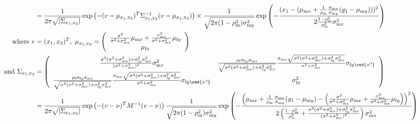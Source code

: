\documentclass{article}
\newcommand{\x}[1]{\text{#1}}
\begin{document}
\begin{landscape}
\begin{align*}
\\&=\frac{1}{2\pi\sqrt{|\Sigma_{x_1,x_2}|}}\exp\left(-(v-\mu_{x_1,x_2})^T\Sigma_{x_1,x_2}^{-1}(v-\mu_{x_1,x_2})\right)\times\frac{1}{\sqrt{2\pi(1-\rho_\x{m}^2)\sigma_{\x{m}y}^2}}\exp\left(-\frac{(x_1-(\mu_{\x{m}x}+\frac{1}{\rho_\x{m}}\frac{\sigma_{\x{m}x}}{\sigma_{\x{m}y}}(y_1-\mu_{\x{m}y})))^2}{2\frac{1-\rho_\x{m}^2}{\rho_\x{m}^2}\sigma_{\x{m}x}^2}\right)
\\ \text{ where }  v&=(x_1,x_2)^T, \ \mu_{x_1,x_2}=\left(\begin{array}{cc}\frac{\sigma^2}{\sigma^2+\sigma_{\x{m}x}^2}\mu_{\x{m}x}+\frac{\sigma_{\x{m}x}^2}{\sigma^2+\sigma_{\x{m}x}^2}\mu_{\x{f}y} \\ \mu_{\x{f}x} \end{array}\right)
\\ \text{ and  } \Sigma_{x_1,x_2} &= \left(\begin{array}{cc}\frac{\sigma^2(\sigma^2+\sigma_{\x{m}x}^2)+\sigma_{\x{f}y}^2\sigma_{\x{m}x}^2}{(\sigma^2+\sigma_{\x{m}x}^2)^2}\sigma_{\x{m}x}^2 & \frac{\rho_\x{f}\sigma_{\x{f}y}\sigma_{\x{m}x}}{\sqrt{\sigma^2(\sigma^2+\sigma_{\x{m}x}^2)+\sigma_{\x{f}y}^2\sigma_{\x{m}x}^2}}\frac{\sigma_{\x{m}x}\sqrt{\sigma^2(\sigma^2+\sigma_{\x{m}x}^2)+\sigma_{\x{f}y}^2\sigma_{\x{m}x}^2}}{\sigma^2+\sigma_{\x{m}x}^2}\sigma_{\x{f}y\red{x?}} \\ \frac{\rho_\x{f}\sigma_{\x{f}y}\sigma_{\x{m}x}}{\sqrt{\sigma^2(\sigma^2+\sigma_{\x{m}x}^2)+\sigma_{\x{f}y}^2\sigma_{\x{m}x}^2}}\frac{\sigma_{\x{m}x}\sqrt{\sigma^2(\sigma^2+\sigma_{\x{m}x}^2)+\sigma_{\x{f}y}^2\sigma_{\x{m}x}^2}}{\sigma^2+\sigma_{\x{m}x}^2}\sigma_{\x{f}y\red{x?}} & \sigma_{\x{f}x}^2 \end{array}\right)
\\&=\frac{1}{2\pi\sqrt{|\Sigma_{x_1,x_2}|}}\exp\left(-(v-\nu)^TM^{-1}(v-\nu)\right)\frac{1}{\sqrt{2\pi(1-\rho_\x{m}^2)\sigma_{\x{m}y}^2}}\exp\left(-\frac{\left(\mu_{\x{m}x}+\frac{1}{\rho_\x{m}}\frac{\sigma_{\x{m}x}}{\sigma_{\x{m}y}}(y_1-\mu_{\x{m}y})-\left(\frac{\sigma^2}{\sigma^2+\sigma_{\x{m}x}^2}\mu_{\x{m}x}+\frac{\sigma_{\x{m}x}^2}{\sigma^2+\sigma_{\x{m}x}^2}\mu_{\x{f}y}\right)\right)^2}{2\left(\frac{1-\rho_\x{m}^2}{\rho_\x{m}^2}+\frac{\sigma^2(\sigma^2+\sigma_{\x{m}x}^2)+\sigma_{\x{f}y}^2\sigma_{\x{m}x}^2}{(\sigma^2+\sigma_{\x{m}x}^2)^2}\right)\sigma_{\x{m}x}^2}\right)
\end{align*}


\end{landscape}
\end{document}
